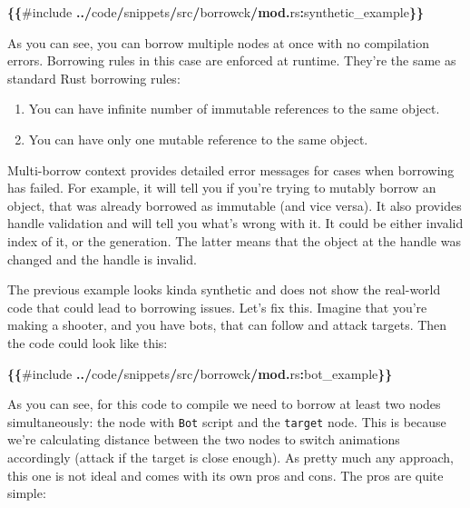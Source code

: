 \documentclass[
]{book}
\newenvironment{Shaded}{\begin{snugshade}}{\end{snugshade}}
\newcommand{\KeywordTok}[1]{\textcolor[rgb]{0.13,0.29,0.53}{\textbf{#1}}}
\newcommand{\NormalTok}[1]{#1}
\newcommand{\OperatorTok}[1]{\textcolor[rgb]{0.81,0.36,0.00}{\textbf{#1}}}
\providecommand{\tightlist}{%
  \setlength{\itemsep}{0pt}\setlength{\parskip}{0pt}}
\theoremstyle{definition}
\theoremstyle{definition}
\theoremstyle{definition}
\theoremstyle{definition}
\theoremstyle{remark}
\begin{document}
\begin{Shaded}
\begin{Highlighting}[]
\OperatorTok{\{\{}\NormalTok{\#include }\OperatorTok{../}\NormalTok{code}\OperatorTok{/}\NormalTok{snippets}\OperatorTok{/}\NormalTok{src}\OperatorTok{/}\NormalTok{borrowck}\OperatorTok{/}\KeywordTok{mod}\OperatorTok{.}\NormalTok{rs}\OperatorTok{:}\NormalTok{synthetic\_example}\OperatorTok{\}\}}
\end{Highlighting}
\end{Shaded}

As you can see, you can borrow multiple nodes at once with no compilation errors. Borrowing rules in this case are enforced at runtime. They're the same as standard Rust borrowing rules:

\begin{enumerate}
\def\labelenumi{\arabic{enumi})}
\tightlist
\item
  You can have infinite number of immutable references to the same object.
\item
  You can have only one mutable reference to the same object.
\end{enumerate}

Multi-borrow context provides detailed error messages for cases when borrowing has failed. For example, it will tell you if you're trying to mutably borrow an object, that was already borrowed as immutable (and vice versa).
It also provides handle validation and will tell you what's wrong with it. It could be either invalid index of it, or the generation. The latter means that the object at the handle was changed and the handle is invalid.

The previous example looks kinda synthetic and does not show the real-world code that could lead to borrowing issues. Let's fix this. Imagine that you're making a shooter, and you have bots, that can follow and attack targets. Then the code could look like this:

\begin{Shaded}
\begin{Highlighting}[]
\OperatorTok{\{\{}\NormalTok{\#include }\OperatorTok{../}\NormalTok{code}\OperatorTok{/}\NormalTok{snippets}\OperatorTok{/}\NormalTok{src}\OperatorTok{/}\NormalTok{borrowck}\OperatorTok{/}\KeywordTok{mod}\OperatorTok{.}\NormalTok{rs}\OperatorTok{:}\NormalTok{bot\_example}\OperatorTok{\}\}}
\end{Highlighting}
\end{Shaded}

As you can see, for this code to compile we need to borrow at least two nodes simultaneously: the node with \texttt{Bot} script and the \texttt{target} node. This is because we're calculating distance between the two nodes to switch animations accordingly (attack if the target is close enough). As pretty much any approach, this one is not ideal and comes with its own pros and cons. The pros are quite simple:
\end{document}

